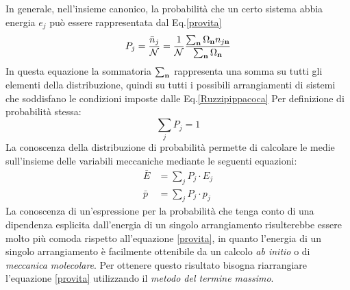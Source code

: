 \documentclass[oneside]{amsbook}
\numberwithin{section}{chapter}
\numberwithin{equation}{section}
\numberwithin{figure}{section}
\begin{document}
In generale, nell'insieme canonico, la probabilità che un certo sistema abbia energia $e_j$ può essere rappresentata dal Eq.\ref{provita}
\begin{equation}
\label{provita}
P_j= \frac{\bar{n}_j}{\mathcal{N}}= \frac{1}{\mathcal{N}}\frac{\sum_\bold{n}\Omega_\bold{n}n_{j\bold{n}}}{\sum_\bold{n}\Omega_\bold{n}}
\end{equation}
In questa equazione la sommatoria $\sum_\bold{n}$ rappresenta una somma su tutti gli elementi della distribuzione, quindi su tutti i possibili arrangiamenti di sistemi che soddisfano le condizioni imposte dalle Eq.\ref{Ruzzipippacoca}
Per definizione di probabilità stessa:
\begin{equation}
\sum_jP_j=1
\end{equation}
La conoscenza della distribuzione di probabilità permette di calcolare le medie sull'insieme delle variabili meccaniche mediante le seguenti equazioni:
\begin{equation}
\begin{aligned}
\bar{E}&=\sum_j P_j\cdot E_j \\
\bar{p}&=\sum_j P_j\cdot p_j
\end{aligned}
\end{equation}
La conoscenza di un'espressione per la probabilità che tenga conto di una dipendenza esplicita dall'energia di un singolo arrangiamento risulterebbe essere molto più comoda rispetto all'equazione \ref{provita}, in quanto l'energia di un singolo arrangiamento è facilmente ottenibile da un calcolo \emph{ab initio} o di \emph{meccanica molecolare}.
Per ottenere questo risultato bisogna riarrangiare l'equazione \ref{provita} utilizzando il \emph{metodo del termine massimo}. 
\end{document}
